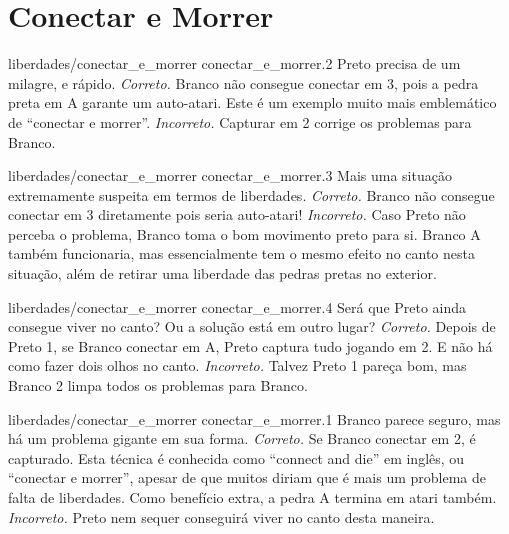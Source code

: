 \chapter{Conectar e Morrer}

\emptypage

\problemAnswerDiagram
  {liberdades/conectar_e_morrer}
  {conectar_e_morrer.2}
  {Preto precisa de um milagre, e rápido.}
  {\emph{Correto.} Branco não consegue conectar em 3, pois a pedra preta em A garante um auto-atari. Este é um exemplo muito mais emblemático de ``conectar e morrer''.}
  {\emph{Incorreto.} Capturar em 2 corrige os problemas para Branco.}

\problemAnswerDiagram
  {liberdades/conectar_e_morrer}
  {conectar_e_morrer.3}
  {Mais uma situação extremamente suspeita em termos de liberdades.}
  {\emph{Correto.} Branco não consegue conectar em 3 diretamente pois seria auto-atari!}
  {\emph{Incorreto.} Caso Preto não perceba o problema, Branco toma o bom movimento preto para si. Branco A também funcionaria, mas essencialmente tem o mesmo efeito no canto nesta situação, além de retirar uma liberdade das pedras pretas no exterior.}

\problemAnswerDiagram
  {liberdades/conectar_e_morrer}
  {conectar_e_morrer.4}
  {Será que Preto ainda consegue viver no canto? Ou a solução está em outro lugar?}
  {\emph{Correto.} Depois de Preto 1, se Branco conectar em A, Preto captura tudo jogando em 2. E não há como fazer dois olhos no canto.}
  {\emph{Incorreto.} Talvez Preto 1 pareça bom, mas Branco 2 limpa todos os problemas para Branco.}

\problemAnswerDiagram
  {liberdades/conectar_e_morrer}
  {conectar_e_morrer.1}
  {Branco parece seguro, mas há um problema gigante em sua forma.}
  {\emph{Correto.} Se Branco conectar em 2, é capturado. Esta técnica é conhecida como ``connect and die'' em inglês, ou ``conectar e morrer'', apesar de que muitos diriam que é mais um problema de falta de liberdades. Como benefício extra, a pedra A termina em atari também.}
  {\emph{Incorreto.} Preto nem sequer conseguirá viver no canto desta maneira.}

\clearedpage
\clearedpage
